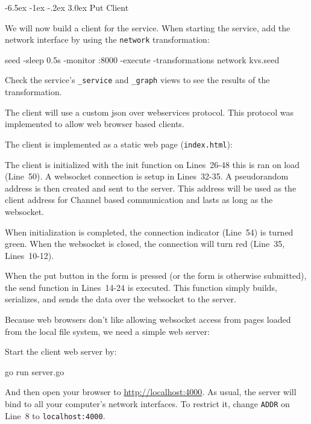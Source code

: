 \documentclass[a5paper,12pt,onecolumn]{article}
\makeatletter
\def\code#1{\mbox{\lstinline{#1}}}
\renewcommand\section{\@startsection {section}{1}{\z@}%
	{-6.5ex \@plus -1ex \@minus -.2ex}%
	{3.0ex}%
	{\sf\Large}}
\makeatother
\begin{document}
\section{Put Client}

We will now build a client for the service. When starting the service, add the network interface by using the \code{network} transformation:

\begin{cli}
seed -sleep 0.5s -monitor :8000 -execute -transformations network kvs.seed
\end{cli}

Check the service's \code{_service} and \code{_graph} views to see the results of the transformation.

The client will use a custom json over webservices protocol. This protocol was implemented to allow web browser based clients.

The client is implemented as a static web page (\code{index.html}):



The client is initialized with the init function on Lines~26-48 this is ran on load (Line~50). A websocket connection is setup in Lines~32-35. A pseudorandom address is then created and sent to the server. This address will be used as the client address for Channel based communication and lasts as long as the websocket.

When initialization is completed, the connection indicator (Line~54) is turned green. When the websocket is closed, the connection will turn red (Line~35, Lines~10-12).

When the put button in the form is pressed (or the form is otherwise submitted), the send function in Lines~14-24 is executed. This function simply builds, serializes, and sends the data over the websocket to the server.

Because web browsers don't like allowing websocket access from pages loaded from the local file system, we need a simple web server:



Start the client web server by:

\begin{cli}
go run server.go
\end{cli}

And then open your browser to \url{http://localhost:4000}. As usual, the server will bind to all your computer's network interfaces. To restrict it, change \code{ADDR} on Line~8 to \code{localhost:4000}.
\end{document}
